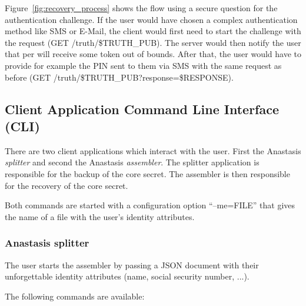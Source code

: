 Figure~\ref{fig:recovery_process} shows the flow using a secure
question for the authentication challenge. If the user would have
chosen a complex authentication method like SMS or E-Mail, the client
would first need to start the challenge with the request (GET
/truth/\$TRUTH\_PUB). The server would then notify the user that per will
receive some token out of bounds. After that, the user would have to
provide for example the PIN sent to them via SMS with the same request
as before (GET /truth/\$TRUTH\_PUB?response=\$RESPONSE).


\subsection{Client Application Command Line Interface (CLI)}

There are two client applications which interact with the user. First
the Anastasis {\em splitter} and second the Anastasis {\em
  assembler}. The splitter application is responsible for the backup
of the core secret. The assembler is then responsible for the recovery
of the core secret.

Both commands are started with a configuration option ``--me=FILE''
that gives the name of a file with the user's identity attributes.

\subsubsection{Anastasis splitter}

The user starts the assembler by passing a JSON document with their
unforgettable identity attributes (name, social security number, ...).

The following commands are available:

